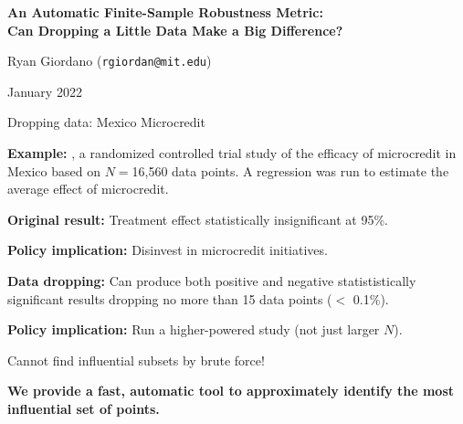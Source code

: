
\begin{frame}

\begin{center}
\large
\textbf{
An Automatic Finite-Sample Robustness Metric:
\\Can Dropping a Little Data Make a Big Difference?}
\end{center}

\hrulefill
\vspace{1em}

Ryan Giordano (\texttt{rgiordan@mit.edu})\footnotemark[1]

January 2022


\end{frame}


\begin{frame}[t]{Dropping data: Mexico Microcredit}


\vspace{1em} \textbf{Example:} \citet{angelucci2015microcredit}, a randomized
controlled trial study of the efficacy of microcredit in Mexico based on $N =
$16,560 data points. A regression was run to estimate the average effect of
microcredit.

\hrulefill

\vspace{1em}
\textbf{Original result: }
Treatment effect statistically insignificant at 95\%.

\vspace{1em}
\textbf{Policy implication: } Disinvest in microcredit initiatives.

\hrulefill

\pause

\vspace{1em} \textbf{Data dropping: } Can produce both positive and negative
statististically significant results dropping no more than 15 data points
($<$ 0.1\%).

\vspace{1em}
\textbf{Policy implication: } Run a higher-powered study (not just
larger $N$).


\hrulefill

\pause

Cannot find influential subsets by brute force!

\vspace{1em}
\textbf{We provide a fast, automatic tool to  approximately identify the
most influential set of points.}


\end{frame}


